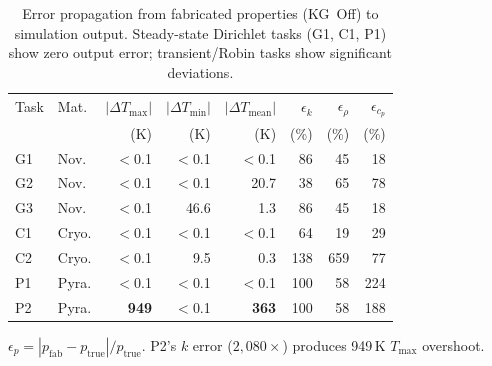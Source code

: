 \begin{table}[t]
\centering
\caption{Error propagation from fabricated properties (KG~Off) to
simulation output.  Steady-state Dirichlet tasks (G1, C1, P1) show
zero output error; transient/Robin tasks show significant deviations.}
\label{tab:error-propagation}
\footnotesize
\setlength{\tabcolsep}{3pt}
\begin{tabular}{@{}llrrrrrr@{}}
\toprule
Task & Mat. & $|\Delta T_{\!\max}|$ & $|\Delta T_{\!\min}|$ &
  $|\Delta T_{\!\mathrm{mean}}|$ & $\epsilon_k$ & $\epsilon_\rho$ & $\epsilon_{c_p}$ \\
  &  & (K) & (K) & (K) & (\%) & (\%) & (\%) \\
\midrule
G1 & Nov. &   $<$0.1 &   $<$0.1 &    $<$0.1 &  86 &  45 &  18 \\
G2 & Nov. &   $<$0.1 &   $<$0.1 &    20.7 &  38 &  65 &  78 \\
G3 & Nov. &   $<$0.1 &   46.6 &     1.3 &  86 &  45 &  18 \\
\midrule
C1 & Cryo. &   $<$0.1 &   $<$0.1 &    $<$0.1 & 64 &  19 &  29 \\
C2 & Cryo. &   $<$0.1 &    9.5 &     0.3 & 138 & 659 &  77 \\
\midrule
P1 & Pyra. &   $<$0.1 &   $<$0.1 &    $<$0.1 & 100 &  58 & 224 \\
P2 & Pyra. & \textbf{949} & $<$0.1 & \textbf{363} & 100 &  58 & 188 \\
\bottomrule
\end{tabular}

\vspace{0.3em}
{\scriptsize $\epsilon_p = |p_{\text{fab}} - p_{\text{true}}|/p_{\text{true}}$.
P2's $k$ error ($2{,}080\times$) produces 949\,K $T_{\max}$ overshoot.}
\end{table}
